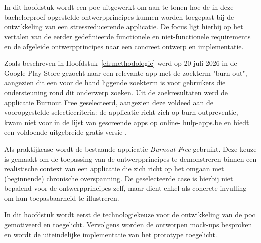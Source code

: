 
\chapter{}%
\label{ch:poc}

In dit hoofdstuk wordt een \acrlong{poc} uitgewerkt om aan te tonen hoe de in deze bachelorproef opgestelde ontwerpprincipes kunnen worden toegepast bij de ontwikkeling van een stressreducerende applicatie. De focus ligt hierbij op het vertalen van de eerder gedefinieerde functionele en niet-functionele requirements en de afgeleide ontwerpprincipes naar een concreet ontwerp en implementatie.

\vspace{1em}

Zoals beschreven in Hoofdstuk~\ref{ch:methodologie} werd op 20 juli 2026 in de Google Play Store gezocht naar een relevante app met de zoekterm "burn-out", aangezien dit een voor de hand liggende zoekterm is voor gebruikers die ondersteuning rond dit onderwerp zoeken. Uit de zoekresultaten werd de applicatie Burnout Free geselecteerd, aangezien deze voldeed aan de vooropgestelde selectiecriteria: de applicatie richt zich op burn-outpreventie, kwam niet voor in de lijst van gescreende apps op online- hulp-apps.be en biedt een voldoende uitgebreide gratis versie \autocite{burnoutfree_app}.

\vspace{1em}

Als praktijkcase wordt de bestaande applicatie \textit{Burnout Free} gebruikt. Deze keuze is gemaakt om de toepassing van de ontwerpprincipes te demonstreren binnen een realistische context van een applicatie die zich richt op het omgaan met (beginnende) chronische overspanning. De geselecteerde case is hierbij niet bepalend voor de ontwerpprincipes zelf, maar dient enkel als concrete invulling om hun toepasbaarheid te illustreren.

\vspace{1em}

In dit hoofdstuk wordt eerst de technologiekeuze voor de ontwikkeling van de \acrshort{poc} gemotiveerd en toegelicht. Vervolgens worden de ontworpen mock-ups besproken en wordt de uiteindelijke implementatie van het prototype toegelicht.

